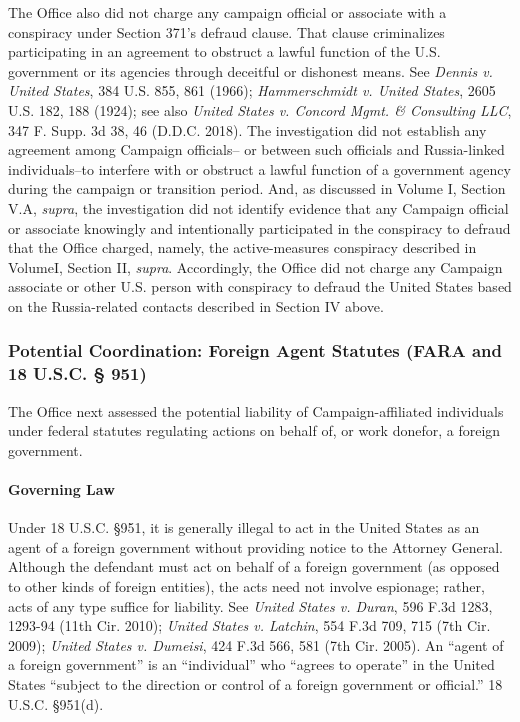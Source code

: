 The Office also did not charge any campaign official or associate with a conspiracy under Section 371's defraud clause. 
That clause criminalizes participating in an agreement to obstruct a lawful function of the U.S. government or its agencies through deceitful or dishonest means. 
See \textit{Dennis v. United States}, 384 U.S. 855, 861 (1966); \textit{Hammerschmidt v. United States}, 2605 U.S. 182, 188 (1924); see also \textit{United States v. Concord Mgmt. \& Consulting LLC}, 347 F. Supp. 3d 38, 46 (D.D.C. 2018). 
The investigation did not establish any agreement among Campaign officials-- or between such officials and Russia-linked individuals--to interfere with or obstruct a lawful function of a government agency during the campaign or transition period. 
And, as discussed in Volume I, Section V.A, \textit{supra}, the investigation did not identify evidence that any Campaign official or associate knowingly and intentionally participated in the conspiracy to defraud that the Office charged, namely, the active-measures conspiracy described in VolumeI, Section II, \textit{supra}.
Accordingly, the Office did not charge any Campaign associate or other U.S. person with conspiracy to defraud the United States based on the Russia-related contacts described in Section IV above.

\subsubsection{Potential Coordination: Foreign Agent Statutes (FARA and 18 U.S.C. § 951)}
The Office next assessed the potential liability of Campaign-affiliated individuals under federal statutes regulating actions on behalf of, or work donefor, a foreign government.

\paragraph{Governing Law}
Under 18 U.S.C. \S 951, it is generally illegal to act in the United States as an agent of a foreign government without providing notice to the Attorney General. 
Although the defendant must act on behalf of a foreign government (as opposed to other kinds of foreign entities), the acts need not involve espionage; rather, acts of any type suffice for liability. 
See \textit{United States v. Duran}, 596 F.3d 1283, 1293-94 (11th Cir. 2010); \textit{United States v. Latchin}, 554 F.3d 709, 715 (7th Cir. 2009); \textit{United States v. Dumeisi}, 424 F.3d 566, 581 (7th Cir. 2005). 
An ``agent of a foreign government'' is an ``individual'' who ``agrees to operate'' in the United States ``subject to the direction or control of a foreign government or official.'' 18 U.S.C. \S 951(d).

